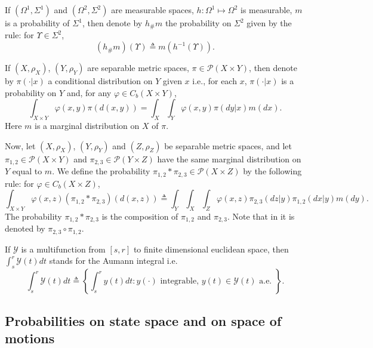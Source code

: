 \documentclass[a4paper,12pt]{article}
\begin{document}
If $(\Omega^1, \Sigma^1)$ and $(\Omega^2, \Sigma^2)$ are measurable spaces, $h:\Omega^1\mapsto\Omega^2$ is measurable, $m$ is a probability of $\Sigma^1$, then denote by $h_\# m$ the probability on $\Sigma^2$ given by the rule: for $\Upsilon\in \Sigma^2$,
\begin{equation}\label{intro:push_forward}
(h_\# m)(\Upsilon)\triangleq m(h^{-1}(\Upsilon)). 
\end{equation}

If $(X,\rho_X)$, $(Y,\rho_Y)$ are separable metric spaces,  $\pi\in\mathcal{P}(X\times Y)$, then denote by $\pi(\cdot|x)$ a conditional distribution on $Y$ given $x$ i.e., for each $x$, $\pi(\cdot|x)$ is a probability on $Y$ and, for any $\varphi\in C_b(X\times Y)$,
\begin{equation}\label{intro:disintegration}
\int_{X\times Y}\varphi(x,y)\pi(d(x,y))=\int_X\int_Y\varphi(x,y)\pi(dy|x)m(dx).  
\end{equation} Here $m$ is a marginal distribution on $X$ of $\pi$.

Now, let $(X,\rho_X)$, $(Y,\rho_Y)$ and $(Z,\rho_Z)$ be separable metric spaces, and let $\pi_{1,2}\in\mathcal{P}(X\times Y)$ and $\pi_{2,3}\in\mathcal{P}(Y\times Z)$ have the same marginal distribution on $Y$ equal to $m$. We define the probability $\pi_{1,2}*\pi_{2,3}\in\mathcal{P}(X\times Z)$  by the following rule: for $\varphi\in C_b(X\times Z)$,
\begin{equation}\label{intro:composition}
\int_{X\times Y}\varphi(x,z)(\pi_{1,2}*\pi_{2,3})(d(x,z))
\triangleq   \int_{Y}\int_X\int_Z\varphi(x,z)\pi_{2,3}(dz|y)\pi_{1,2}(dx|y)m(dy).
\end{equation} The probability $\pi_{1,2}*\pi_{2,3}$ is the composition of $\pi_{1,2}$ and $\pi_{2,3}$. Note that in \cite{Ambrosio} it is denoted by $\pi_{2,3}\circ\pi_{1,2}$.

If $\mathcal{Y}$ is a multifunction from $[s,r]$ to finite dimensional euclidean space, then $\int_s^r\mathcal{Y}(t)dt$ stands for the Aumann integral i.e.
$$\int_s^r\mathcal{Y}(t)dt\triangleq \left\{\int_s^r y(t)dt:y(\cdot)\text{ integrable, }y(t)\in \mathcal{Y}(t)\text{ a.e. }\right\}. $$

\subsection{Probabilities on state space and on space of motions}\label{subsect:state}
\end{document}
